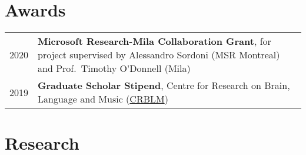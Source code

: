 \documentclass[11pt,a4paper]{article}
\begin{document}
  \section{Awards}
  \begin{longtable}{p{1.7cm}|p{15cm}}
    \textsc{2020}&%
      \textbf{Microsoft Research-Mila Collaboration Grant}, for project
      supervised by Alessandro Sordoni (MSR Montreal) and Prof.\ Timothy
      O'Donnell (Mila)\\
    \textsc{2019}&%
      \textbf{Graduate Scholar Stipend}, Centre for Research on Brain, Language
      and Music (\href{https://crblm.ca/}{CRBLM})\\
  \end{longtable}

  \section{Research}

  \vspace{5pt}
  \nocite{hoover.j:2021,hoover.j:2020,hoover.j:2020wccflhandout}
  \AtNextBibliography{\small}
  \printbibliography[heading=none]{}
  \vspace{5pt}

\end{document}
